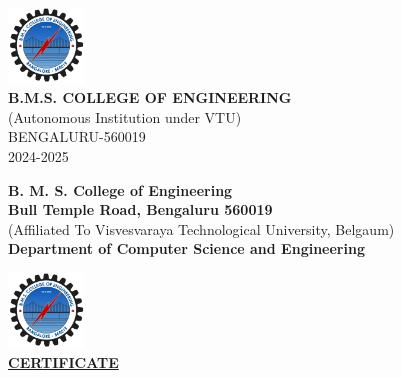 \begin{titlepage}
    \vspace{1cm}
    
    \includegraphics[width=0.15\textwidth]{bmsce.png} \\
    \vspace{0.5cm}
    {\Large \textbf{B.M.S. COLLEGE OF ENGINEERING}} \\[0.5em]
    {\large (Autonomous Institution under VTU)} \\[0.5em]
    { BENGALURU-560019} \\[0.5em]
    { 2024-2025} \\
    

\end{titlepage}

\clearpage


    \begin{center}
    
    {\Large \textbf{B. M. S. College of Engineering}}\\[0.25em]
    {\large \textbf{Bull Temple Road, Bengaluru 560019}}\\[0.25em]
    
    (Affiliated To Visvesvaraya Technological University, Belgaum)\\[0.25em]
    \textbf{Department of Computer Science and Engineering}
        

    \vspace{0.75cm}
    \includegraphics[width=0.15\textwidth]{bmsce.png}\\
    \vspace{0.75cm}
    \textbf{\Large \underline{CERTIFICATE}}\\
    \vspace{0.5cm}
    \end{center}

